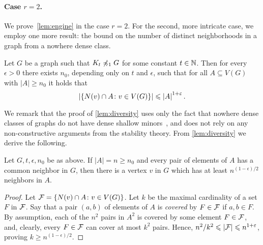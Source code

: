 \paragraph{Case $r=2$.}
We prove~\cref{lem:engine} in the case $r=2$.
For the second, more intricate case, 
we employ one more result: the bound on the number of distinct neighborhoods in a graph from a nowhere dense class.

\begin{lemma}\label{lem:diversity}
Let $G$ be a graph such that $K_t\not\minor_{1} G$ for some constant $t\in \N$. 
Then for every $\epsilon>0$ there exists $n_0$, depending only on $t$ and $\epsilon$, such that for all $A\subseteq V(G)$ with $|A|\geq n_0$ it holds that
\[\abs{\{N(v)\cap A \colon v\in V(G)\}}\leq\abs{A}^{1+\epsilon}.\]
\end{lemma}



We remark that the proof of \cref{lem:diversity} uses only the fact that
nowhere dense classes of graphs do not have dense 
shallow minors~\cite{dvorak2007asymptotical,jiang2011compact}, and does not rely on any non-constructive arguments from the stability theory.
From \cref{lem:diversity} we derive the following.

\begin{corollary}\label{cor:diversity}
  Let $G,t,\epsilon,n_0$ be as above.
  If $|A|=n\ge n_0$ and every pair of elements of $A$ has a common neighbor in $G$,
  then there is a vertex $v$ in $G$ which has at least $n^{(1-\epsilon)/2}$ neighbors in $A$.
\end{corollary}
\begin{proof}Let ${\cal F}=\set{N(v)\cap A\colon v\in V(G)}$. 
  Let $k$ be the maximal cardinality of a set $F$ in ${\cal F}$.
  Say that a pair $(a,b)$ of elements of $A$ is \emph{covered} by $F\in {\cal F}$
  if  $a,b\in F$.
  By assumption, each of the $n^2$ pairs in $A^2$ is covered by some element $F\in {\cal F}$, and,
  clearly, every $F\in {\cal F}$ can cover at most $k^2$ pairs. 
  Hence, $n^2/k^2\le |{\cal F}|\le  n^{1+\epsilon}$, proving $k\ge n^{(1-\epsilon)/2}$.
\end{proof}

